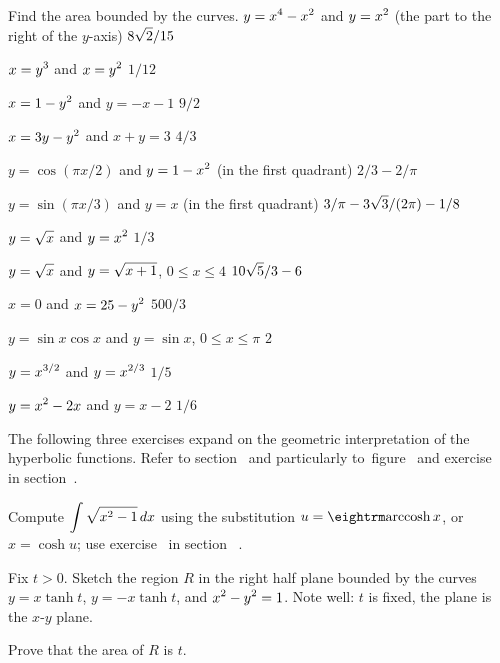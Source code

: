 \exercises

Find the area bounded by the curves.
\nobreak
\exercise $\displaystyle y=x^4-x^2$ and $\displaystyle y=x^2$ (the part to the right of the $y$-axis)
\answer $\displaystyle 8\sqrt2/15$
\endanswer
\endexercise

\exercise $\displaystyle x=y^3$ and $\displaystyle x=y^2$
\answer $1/12$
\endanswer
\endexercise

\exercise $\displaystyle x=1-y^2$ and $y=-x-1$
\answer $9/2$
\endanswer
\endexercise

\exercise $\displaystyle x=3y-y^2$ and $x+y=3$
\answer $4/3$
\endanswer
\endexercise

\exercise $y=\cos(\pi x/2)$ and $\displaystyle y=1- x^2$ (in the first quadrant)
\answer $2/3-2/\pi$
\endanswer
\endexercise

\exercise $y=\sin(\pi x/3)$ and $y=x$ (in the first quadrant)
\answer $\displaystyle 3/\pi - 3\sqrt3/(2\pi)-1/8$
\endanswer
\endexercise

\exercise $\displaystyle y=\sqrt{x}$ and $\displaystyle y=x^2$
\answer $1/3$
\endanswer
\endexercise

\exercise $\displaystyle y=\sqrt x$ and $\displaystyle y=\sqrt{x+1}$, $0\le x\le 4$
\answer $\displaystyle 10\sqrt{5}/3-6$
\endanswer
\endexercise

\exercise $x=0$ and $\displaystyle x=25-y^2$
\answer $500/3$
\endanswer
\endexercise

\exercise $y=\sin x\cos x$ and $y=\sin x$, $0\le x\le \pi$
\answer $2$
\endanswer
\endexercise

\exercise $\displaystyle y=x^{3/2}$ and $\displaystyle y=x^{2/3}$
\answer $1/5$
\endanswer
\endexercise

\exercise $\displaystyle y=x^2-2x$ and $y=x-2$
\answer $1/6$
\endanswer
\endexercise

\iflatetranscendentals
\elselatetranscendentals
\vskip15pt\noindent
The following three exercises expand on the geometric interpretation
of the hyperbolic functions. Refer to section~
and particularly to~figure~ and 
exercise~
in section~.

\exercise
Compute $\displaystyle \int \sqrt{x^2 -1}\,dx $ using the substitution
$u=\arccosh x$, or $x=\cosh u$; 
use exercise~
in section ~.
\endexercise

\exercise  Fix $t>0$.
  Sketch the region $R$ in the right half plane bounded by the curves 
$y=x\tanh t$, $y=-x\tanh t$,  and $\displaystyle x^2-y^2 =1$. Note well: $t$ is fixed,
the plane is the $x$-$y$ plane.
\endexercise

\exercise Prove that the area of $R$ is $t$.
\endexercise
\filatetranscendentals

\endexercises

